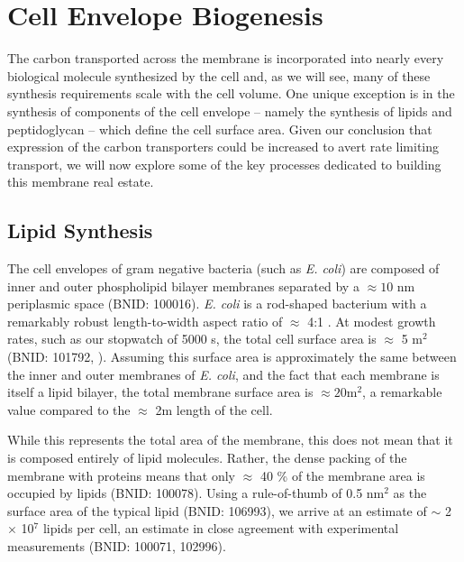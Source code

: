 \section{Cell Envelope Biogenesis}
The carbon transported across the membrane is incorporated into nearly every
biological molecule synthesized by the cell and, as we will see, many of these
synthesis requirements scale with the cell volume. One unique exception is in
the synthesis of components of the cell envelope -- namely the synthesis of
lipids and peptidoglycan -- which define the cell surface area. Given our
conclusion that expression of the carbon transporters could be increased to
avert rate limiting transport, we will now explore some of the key processes
dedicated to building this membrane real estate.

\subsection{Lipid Synthesis}
The cell envelopes of gram negative bacteria (such as \textit{E. coli}) are
composed of inner and outer phospholipid bilayer membranes separated by a
$\approx 10$ nm periplasmic space (BNID: 100016). \textit{E. coli} is a
rod-shaped bacterium with a remarkably robust length-to-width aspect ratio of
$\approx$ 4:1 \citep{harris2018}. At modest growth rates, such as our stopwatch of
5000 s, the total cell surface area is $\approx$ 5 \textmu m$^2$ (BNID: 101792,
\cite{milo2010}). Assuming this surface area is approximately the same between
the inner and outer membranes of \textit{E. coli}, and the fact that each
membrane is itself a lipid bilayer, the total membrane surface area is $\approx 20$\textmu m$^2$, a
remarkable value compared to the $\approx$ 2\textmu m length of the cell.

While this represents the total area of the membrane, this does not mean that it
is composed entirely of lipid molecules. Rather, the dense packing of the
membrane with proteins means that only $\approx$ 40 \% of the membrane area is
occupied by lipids (BNID: 100078). Using a rule-of-thumb of 0.5
nm$^2$ as the surface area of the typical lipid (BNID: 106993),
we arrive at an estimate of $\sim$ 2 $\times$ 10$^7$ lipids per cell, an
estimate in close agreement with experimental measurements (BNID: 100071,
102996).

